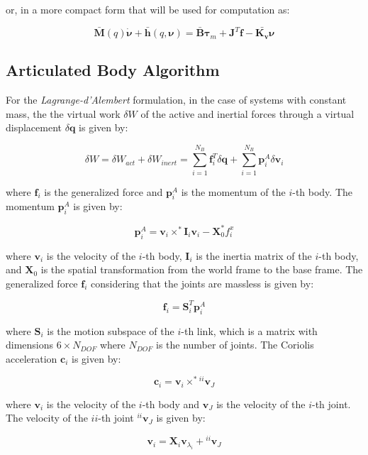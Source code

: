or, in a more compact form that will be used for computation as:

\begin{equation}
    \mathbf{\bar{M}}(q)\dot{\boldsymbol{\nu}} + \mathbf{\bar{h}}(q,\boldsymbol{\nu}) = \mathbf{\bar{B}}\boldsymbol{\tau} _m + \mathbf{J} ^T \mathbf{f} - \bar{\mathbf{K _v}}\boldsymbol{\nu}
\end{equation}

\subsection{Articulated Body Algorithm}

For the \textit{Lagrange-d'Alembert} formulation, in the case of systems with constant mass, the the virtual work $\delta W$ of the active and inertial forces through a virtual displacement $\delta \mathbf{q}$ is given by:

$$
    \delta W = \delta W _{act} + \delta W _{inert} = \sum _{i = 1} ^{N _B} \mathbf{f} _i ^T \delta \mathbf{q} + \sum _{i = 1} ^{N _B} \mathbf{p} ^A _i \delta \mathbf{v} _i
$$

where $\mathbf{f} _i$ is the generalized force and $\mathbf{p} ^A _i$ is the momentum of the $i$-th body. The momentum $\mathbf{p} ^A _i$ is given by:

$$
    \mathbf{p} ^A _i = \mathbf{v} _i \times ^* \mathbf{I} _i \mathbf{v} _i - \mathbf{X} ^* _0 f ^x _i
$$

where $\mathbf{v} _i$ is the velocity of the $i$-th body, $\mathbf{I} _i$ is the inertia matrix of the $i$-th body, and $\mathbf{X} _0$ is the spatial transformation from the world frame to the base frame. The generalized force $\mathbf{f} _i$ considering that the joints are massless is given by:

$$
    \mathbf{f} _i = \mathbf{S} ^T _i \mathbf{p} ^A _i
$$

where $\mathbf{S} _i$ is the motion subspace of the $i$-th link, which is a matrix with dimensions $6 \times N _{DOF}$ where $N _{DOF}$ is the number of joints. The Coriolis acceleration $\mathbf{c} _i$ is given by:

$$
    \mathbf{c} _i = \mathbf{v} _i \times ^* {} ^{ii}\mathbf{v} _J
$$

where $\mathbf{v} _i$ is the velocity of the $i$-th body and $\mathbf{v} _J$ is the velocity of the $i$-th joint. The velocity of the $ii$-th joint ${} ^{ii}\mathbf{v} _J$ is given by:

$$
    \mathbf{v} _i = \mathbf{X} _i \mathbf{v} _{\lambda _i} + {} ^{ii}\mathbf{v} _J
$$

